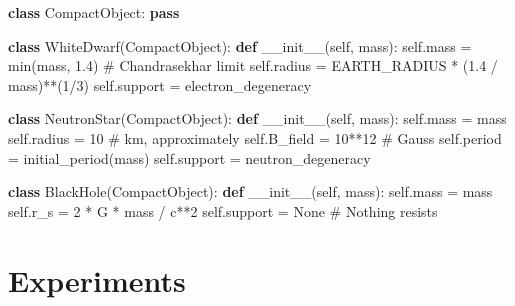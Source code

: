 \documentclass[
  11pt,
  letterpaper,
  twoside,
  openright]{book}
\newenvironment{Shaded}{\begin{snugshade}}{\end{snugshade}}
\newcommand{\BuiltInTok}[1]{\textcolor[rgb]{0.00,0.23,0.31}{#1}}
\newcommand{\CommentTok}[1]{\textcolor[rgb]{0.37,0.37,0.37}{#1}}
\newcommand{\ControlFlowTok}[1]{\textcolor[rgb]{0.00,0.23,0.31}{\textbf{#1}}}
\newcommand{\DecValTok}[1]{\textcolor[rgb]{0.68,0.00,0.00}{#1}}
\newcommand{\FloatTok}[1]{\textcolor[rgb]{0.68,0.00,0.00}{#1}}
\newcommand{\FunctionTok}[1]{\textcolor[rgb]{0.28,0.35,0.67}{#1}}
\newcommand{\KeywordTok}[1]{\textcolor[rgb]{0.00,0.23,0.31}{\textbf{#1}}}
\newcommand{\NormalTok}[1]{\textcolor[rgb]{0.00,0.23,0.31}{#1}}
\newcommand{\OperatorTok}[1]{\textcolor[rgb]{0.37,0.37,0.37}{#1}}
\newcommand{\StringTok}[1]{\textcolor[rgb]{0.13,0.47,0.30}{#1}}
\newcommand{\VariableTok}[1]{\textcolor[rgb]{0.07,0.07,0.07}{#1}}
\begin{document}
\begin{Shaded}
\begin{Highlighting}[]
\KeywordTok{class}\NormalTok{ CompactObject:}
    \ControlFlowTok{pass}

\KeywordTok{class}\NormalTok{ WhiteDwarf(CompactObject):}
    \KeywordTok{def} \FunctionTok{\_\_init\_\_}\NormalTok{(}\VariableTok{self}\NormalTok{, mass):}
        \VariableTok{self}\NormalTok{.mass }\OperatorTok{=} \BuiltInTok{min}\NormalTok{(mass, }\FloatTok{1.4}\NormalTok{)  }\CommentTok{\# Chandrasekhar limit}
        \VariableTok{self}\NormalTok{.radius }\OperatorTok{=}\NormalTok{ EARTH\_RADIUS }\OperatorTok{*}\NormalTok{ (}\FloatTok{1.4} \OperatorTok{/}\NormalTok{ mass)}\OperatorTok{**}\NormalTok{(}\DecValTok{1}\OperatorTok{/}\DecValTok{3}\NormalTok{)}
        \VariableTok{self}\NormalTok{.support }\OperatorTok{=} \StringTok{\textquotesingle{}electron\_degeneracy\textquotesingle{}}

\KeywordTok{class}\NormalTok{ NeutronStar(CompactObject):}
    \KeywordTok{def} \FunctionTok{\_\_init\_\_}\NormalTok{(}\VariableTok{self}\NormalTok{, mass):}
        \VariableTok{self}\NormalTok{.mass }\OperatorTok{=}\NormalTok{ mass}
        \VariableTok{self}\NormalTok{.radius }\OperatorTok{=} \DecValTok{10}  \CommentTok{\# km, approximately}
        \VariableTok{self}\NormalTok{.B\_field }\OperatorTok{=} \DecValTok{10}\OperatorTok{**}\DecValTok{12}  \CommentTok{\# Gauss}
        \VariableTok{self}\NormalTok{.period }\OperatorTok{=}\NormalTok{ initial\_period(mass)}
        \VariableTok{self}\NormalTok{.support }\OperatorTok{=} \StringTok{\textquotesingle{}neutron\_degeneracy\textquotesingle{}}

\KeywordTok{class}\NormalTok{ BlackHole(CompactObject):}
    \KeywordTok{def} \FunctionTok{\_\_init\_\_}\NormalTok{(}\VariableTok{self}\NormalTok{, mass):}
        \VariableTok{self}\NormalTok{.mass }\OperatorTok{=}\NormalTok{ mass}
        \VariableTok{self}\NormalTok{.r\_s }\OperatorTok{=} \DecValTok{2} \OperatorTok{*}\NormalTok{ G }\OperatorTok{*}\NormalTok{ mass }\OperatorTok{/}\NormalTok{ c}\OperatorTok{**}\DecValTok{2}
        \VariableTok{self}\NormalTok{.support }\OperatorTok{=} \VariableTok{None}  \CommentTok{\# Nothing resists}
\end{Highlighting}
\end{Shaded}

\section{Experiments}\label{experiments-23}
\end{document}
